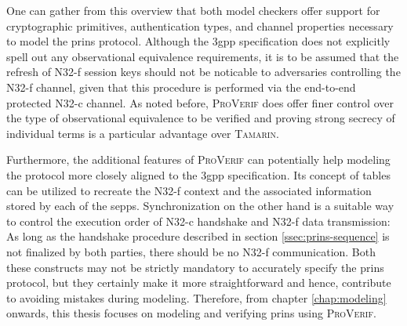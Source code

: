 One can gather from this overview that both model checkers offer support for cryptographic primitives, authentication types, and channel properties necessary to model the \gls{prins} protocol.
Although the \gls{3gpp} specification does not explicitly spell out any observational equivalence requirements, it is to be assumed that the refresh of N32-f session keys should not be noticable to adversaries controlling the N32-f channel, given that this procedure is performed via the end-to-end protected N32-c channel.
As noted before, \textsc{ProVerif} does offer finer control over the type of observational equivalence to be verified and proving strong secrecy of individual terms is a particular advantage over \textsc{Tamarin}.

Furthermore, the additional features of \textsc{ProVerif} can potentially help modeling the protocol more closely aligned to the \gls{3gpp} specification.
Its concept of tables can be utilized to recreate the N32-f context and the associated information stored by each of the \glspl{sepp}.
Synchronization on the other hand is a suitable way to control the execution order of \mbox{N32-c} handshake and N32-f data transmission:
As long as the handshake procedure described in section \ref{ssec:prins-sequence} is not finalized by both parties, there should be no N32-f communication.
Both these constructs may not be strictly mandatory to accurately specify the \gls{prins} protocol, but they certainly make it more straightforward and hence, contribute to avoiding mistakes during modeling.
Therefore, from chapter \ref{chap:modeling} onwards, this thesis focuses on modeling and verifying \gls{prins} using \textsc{ProVerif}.